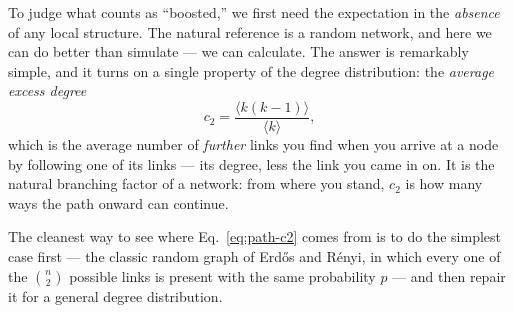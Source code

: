 To judge what counts as ``boosted,'' we first need the expectation in the
\emph{absence} of any local structure. The natural reference is a random network,
and here we can do better than simulate --- we can calculate. The answer is
remarkably simple, and it turns on a single property of the degree distribution:
the \emph{average excess degree}
\begin{equation}
  c_2 = \frac{\langle k(k-1)\rangle}{\langle k\rangle},
  \label{eq:path-c2}
\end{equation}
which is the average number of \emph{further} links you find when you arrive at a
node by following one of its links --- its degree, less the link you came in on.
It is the natural branching factor of a network: from where you stand, $c_2$ is
how many ways the path onward can continue.

The cleanest way to see where Eq.~\eqref{eq:path-c2} comes from is to do the
simplest case first --- the classic random graph of Erd\H{o}s and R\'enyi, in which
every one of the $\binom{n}{2}$ possible links is present with the same probability
$p$ --- and then repair it for a general degree distribution.

